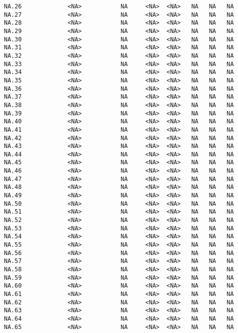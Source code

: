 \documentclass[
  letterpaper,
  DIV=11,
  numbers=noendperiod]{scrartcl}
\begin{document}
\begin{verbatim}
NA.26             <NA>           NA     <NA>  <NA>   NA   NA   NA
NA.27             <NA>           NA     <NA>  <NA>   NA   NA   NA
NA.28             <NA>           NA     <NA>  <NA>   NA   NA   NA
NA.29             <NA>           NA     <NA>  <NA>   NA   NA   NA
NA.30             <NA>           NA     <NA>  <NA>   NA   NA   NA
NA.31             <NA>           NA     <NA>  <NA>   NA   NA   NA
NA.32             <NA>           NA     <NA>  <NA>   NA   NA   NA
NA.33             <NA>           NA     <NA>  <NA>   NA   NA   NA
NA.34             <NA>           NA     <NA>  <NA>   NA   NA   NA
NA.35             <NA>           NA     <NA>  <NA>   NA   NA   NA
NA.36             <NA>           NA     <NA>  <NA>   NA   NA   NA
NA.37             <NA>           NA     <NA>  <NA>   NA   NA   NA
NA.38             <NA>           NA     <NA>  <NA>   NA   NA   NA
NA.39             <NA>           NA     <NA>  <NA>   NA   NA   NA
NA.40             <NA>           NA     <NA>  <NA>   NA   NA   NA
NA.41             <NA>           NA     <NA>  <NA>   NA   NA   NA
NA.42             <NA>           NA     <NA>  <NA>   NA   NA   NA
NA.43             <NA>           NA     <NA>  <NA>   NA   NA   NA
NA.44             <NA>           NA     <NA>  <NA>   NA   NA   NA
NA.45             <NA>           NA     <NA>  <NA>   NA   NA   NA
NA.46             <NA>           NA     <NA>  <NA>   NA   NA   NA
NA.47             <NA>           NA     <NA>  <NA>   NA   NA   NA
NA.48             <NA>           NA     <NA>  <NA>   NA   NA   NA
NA.49             <NA>           NA     <NA>  <NA>   NA   NA   NA
NA.50             <NA>           NA     <NA>  <NA>   NA   NA   NA
NA.51             <NA>           NA     <NA>  <NA>   NA   NA   NA
NA.52             <NA>           NA     <NA>  <NA>   NA   NA   NA
NA.53             <NA>           NA     <NA>  <NA>   NA   NA   NA
NA.54             <NA>           NA     <NA>  <NA>   NA   NA   NA
NA.55             <NA>           NA     <NA>  <NA>   NA   NA   NA
NA.56             <NA>           NA     <NA>  <NA>   NA   NA   NA
NA.57             <NA>           NA     <NA>  <NA>   NA   NA   NA
NA.58             <NA>           NA     <NA>  <NA>   NA   NA   NA
NA.59             <NA>           NA     <NA>  <NA>   NA   NA   NA
NA.60             <NA>           NA     <NA>  <NA>   NA   NA   NA
NA.61             <NA>           NA     <NA>  <NA>   NA   NA   NA
NA.62             <NA>           NA     <NA>  <NA>   NA   NA   NA
NA.63             <NA>           NA     <NA>  <NA>   NA   NA   NA
NA.64             <NA>           NA     <NA>  <NA>   NA   NA   NA
NA.65             <NA>           NA     <NA>  <NA>   NA   NA   NA

\end{verbatim}
\end{document}

